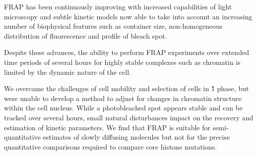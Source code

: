     FRAP has been continuously improving with increased capabilities of light microscopy
    and subtle kinetic models now able to take into account
    an increasing number of biophysical features such as container size, 
    non-homogeneous distribution of fluorescence and profile of bleach spot.

    Despite these advances, the ability to perform FRAP experiments 
    over extended time periods of several hours for highly stable complexes
    such as chromatin is limited by the dynamic nature of the cell.

    We overcame the challenges of cell mobility and selection of cells in \G1{} phase,
    but were unable to develop a method to adjust for changes in chromatin structure within the cell nucleus.
    While a photobleached spot appears stable and can be tracked over several hours, 
    small natural disturbances impact on the recovery and estimation of kinetic parameters.
    We find that FRAP is suitable for semi-quantitative estimates of slowly diffusing molecules
    but not for the precise quantitative comparisons required to compare core histone mutations.



